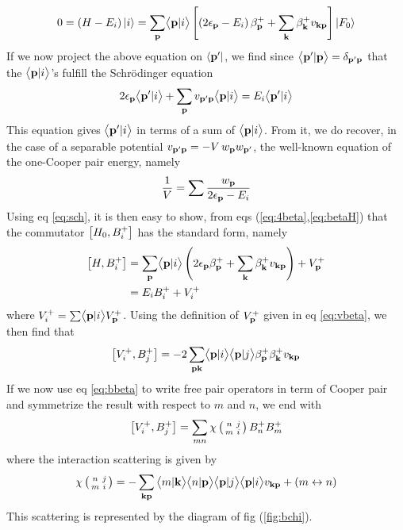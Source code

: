 \documentclass[aps,pra,amsmath,amssymb,preprint,groupedaddress]{revtex4}
\begin{document}
\begin{equation}
0=\left(H-E_i\right)\left|i\right>=\sum_{\mathbf{p}}\bigl<{{\mathbf{p}}|{i}}\bigr>\left[\left(2\epsilon_{\mathbf{p}}-E_i\right)\beta^+_{\mathbf{p}}+\sum_{\mathbf{k}}\beta^+_{\mathbf{k}}{}v_{\mathbf{k}\mathbf{p}}\right]\left|F_0\right>
\end{equation}  
If we now  project the above equation on $\left<\mathbf{p}'\right|$, we find since $\bigl<{{\mathbf{p}'}|{\mathbf{p}}}\bigr>=\delta_{\mathbf{p}'\mathbf{p}}$ that the $\bigl<{{\mathbf{p}}|{i}}\bigr>$'s fulfill the Schr\"{o}dinger equation
\begin{equation}\label{eq:sch}
2\epsilon_{\mathbf{p}}\bigl<{{\mathbf{p}'}|{i}}\bigr>+\sum_{\mathbf{p}}{v_{\mathbf{p}'\mathbf{p}}\bigl<{{\mathbf{p}}|{i}}\bigr>}=E_i\bigl<{{\mathbf{p}'}|{i}}\bigr>
\end{equation}
This equation gives $\bigl<{{\mathbf{p}'}|{i}}\bigr>$ in terms of a sum of $\bigl<{{\mathbf{p}}|{i}}\bigr>$. From it, we do recover, in the case of a separable potential $v_{\mathbf{p}'\mathbf{p}}=-V\,w_{\mathbf{p}}{}w_{\mathbf{p}'}$,  the well-known equation  of the one-Cooper pair energy, namely
\begin{equation}
\frac{1}{V}=\sum\frac{w_{\mathbf{p}}}{2\epsilon_{\mathbf{p}}-E_i}
\end{equation}
Using eq  \eqref{eq:sch}, it is then easy to show, from eqs (\ref{eq:4beta},\ref{eq:betaH}) that the commutator $\left[H_0,B^+_i\right]$ has the standard form, namely
\begin{equation}
\begin{split}
\left[H,B^+_i\right]&=\sum_{\mathbf{p}}\bigl<{{\mathbf{p}}|{i}}\bigr>\left(2\epsilon_{\mathbf{p}}\beta^+_{\mathbf{p}}+\sum_{\mathbf{k}}\beta^+_{\mathbf{k}}{}v_{\mathbf{k}\mathbf{p}}\right)+V^+_{\mathbf{p}}\\
&=E_iB^+_i+V^+_i
\end{split}
\end{equation}
where $V^+_i=\sum\bigl<{{\mathbf{p}}|{i}}\bigr>V^+_{\mathbf{p}}$. Using the definition of $V^+_{\mathbf{p}}$ given in eq \eqref{eq:vbeta}, we then find that 
\begin{equation}
\left[V^+_i,B^+_j\right]=-2\sum_{\mathbf{p}\mathbf{k}}\bigl<{{\mathbf{p}}|{i}}\bigr>\bigl<{{\mathbf{p}}|{j}}\bigr>\beta^+_{\mathbf{p}}\beta^+_{\mathbf{k}}{}v_{\mathbf{k}\mathbf{p}}
\end{equation}
If we now use eq \eqref{eq:bbeta} to write free pair operators in term of Cooper pair and symmetrize the result with respect to $m$ and $n$, we end with
\begin{equation}
\left[V^+_i,B^+_j\right]=\sum_{mn}\chi\left(\begin{smallmatrix}n&j\\m&i\end{smallmatrix}\right)B^+_nB^+_m
\end{equation}
where the interaction scattering is given by
\begin{equation}\label{eq:bchi}
\chi\left(\begin{smallmatrix}n&j\\m&i\end{smallmatrix}\right)=-\sum_{\mathbf{k}\mathbf{p}}{\bigl<{{m}|{\mathbf{k}}}\bigr>\bigl<{{n}|{\mathbf{p}}}\bigr>\bigl<{{\mathbf{p}}|{j}}\bigr>\bigl<{{\mathbf{p}}|{i}}\bigr>v_{\mathbf{k}\mathbf{p}}}+\left(m\leftrightarrow{n}\right)
\end{equation}
This scattering is represented by the diagram of fig (\ref{fig:bchi}).
\end{document}

